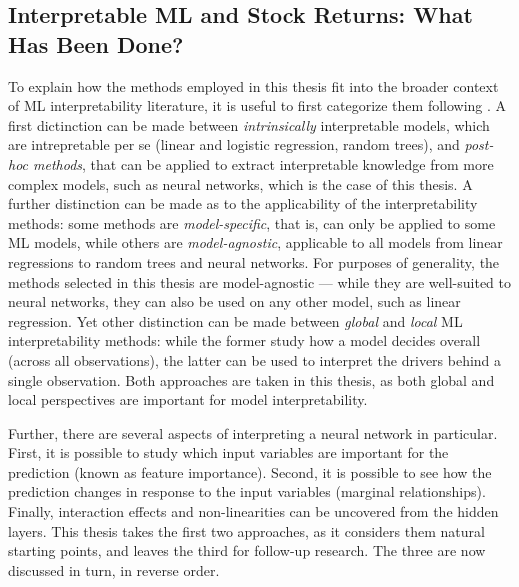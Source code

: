 	
		\subsection{Interpretable ML and Stock Returns: What Has Been Done?}
		
			To explain how the methods employed in this thesis fit into the broader context of ML interpretability literature, it is useful to first categorize them following \cite{molnar2020interpretable}. A first dictinction can be made between \textit{intrinsically} interpretable models, which are intrepretable per se (linear and logistic regression, random trees), and \textit{post-hoc methods}, that can be applied to extract interpretable knowledge from more complex models, such as neural networks, which is the case of this thesis. A further distinction can be made as to the applicability of the interpretability methods: some methods are \textit{model-specific}, that is, can only be applied to some ML models, while others are \textit{model-agnostic}, applicable to all models from linear regressions to random trees and neural networks. For purposes of generality, the methods selected in this thesis are model-agnostic --- while they are well-suited to neural networks, they can also be used on any other model, such as linear regression. Yet other distinction can be made between \textit{global} and \textit{local} ML interpretability methods: while the former study how a model decides overall (across all observations), the latter can be used to interpret the drivers behind a single observation. Both approaches are taken in this thesis, as both global and local perspectives are important for model interpretability. 
			
			Further, there are several aspects of interpreting a neural network in particular. First, it is possible to study which input variables are important for the prediction (known as feature importance). Second, it is possible to see how the prediction changes in response to the input variables (marginal relationships). Finally, interaction effects and non-linearities can be uncovered from the hidden layers. This thesis takes the first two approaches, as it considers them natural starting points, and leaves the third for follow-up research. The three are now discussed in turn, in reverse order.  

